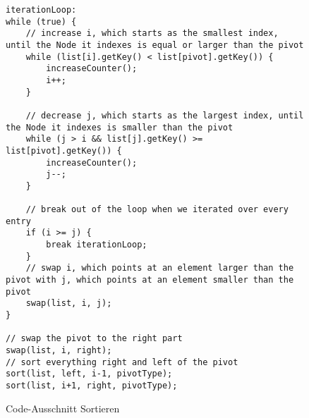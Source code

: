 \documentclass[11pt]{scrartcl}
\begin{document}
\begin{figure}
\begin{verbatim}
iterationLoop:
while (true) {
    // increase i, which starts as the smallest index, until the Node it indexes is equal or larger than the pivot
    while (list[i].getKey() < list[pivot].getKey()) {
        increaseCounter();
        i++;
    }

    // decrease j, which starts as the largest index, until the Node it indexes is smaller than the pivot
    while (j > i && list[j].getKey() >= list[pivot].getKey()) {
        increaseCounter();
        j--;
    }

    // break out of the loop when we iterated over every entry
    if (i >= j) {
        break iterationLoop;
    }
    // swap i, which points at an element larger than the pivot with j, which points at an element smaller than the pivot
    swap(list, i, j);
}

// swap the pivot to the right part
swap(list, i, right);
// sort everything right and left of the pivot
sort(list, left, i-1, pivotType);
sort(list, i+1, right, pivotType);
\end{verbatim}
\caption{Code-Ausschnitt Sortieren}
\label{figure:sortCode}
\end{figure}
\end{document}

